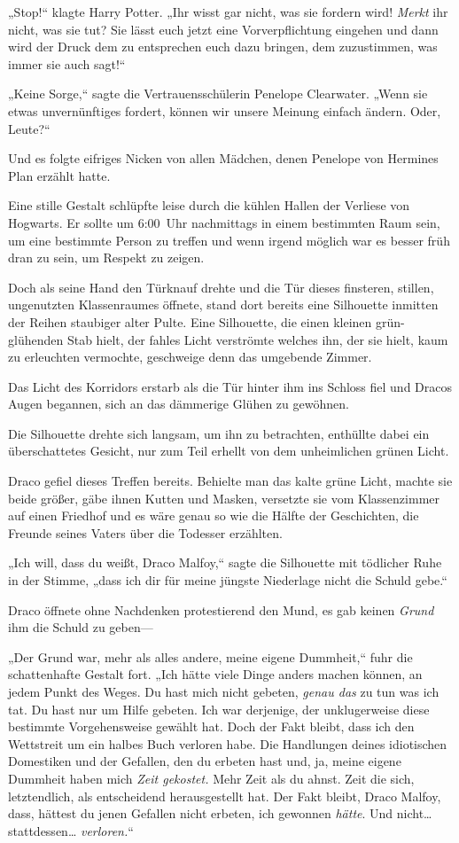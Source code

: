 {„Stop!“ klagte Harry Potter. „Ihr wisst gar nicht, was sie fordern wird! \emph{Merkt} ihr nicht, was sie tut? Sie lässt euch jetzt eine Vorverpflichtung eingehen und dann wird der Druck dem zu entsprechen euch dazu bringen, dem zuzustimmen, was immer sie auch sagt!“

„Keine Sorge,“ sagte die Vertrauensschülerin Penelope Clearwater. „Wenn sie etwas unvernünftiges fordert, können wir unsere Meinung einfach ändern. Oder, Leute?“

Und es folgte eifriges Nicken von allen Mädchen, denen Penelope von Hermines Plan erzählt hatte.

\later

Eine stille Gestalt schlüpfte leise durch die kühlen Hallen der Verliese von Hogwarts. Er sollte um 6:00~Uhr nachmittags in einem bestimmten Raum sein, um eine bestimmte Person zu treffen und wenn irgend möglich war es besser früh dran zu sein, um Respekt zu zeigen.

Doch als seine Hand den Türknauf drehte und die Tür dieses finsteren, stillen, ungenutzten Klassenraumes öffnete, stand dort bereits eine Silhouette inmitten der Reihen staubiger alter Pulte. Eine Silhouette, die einen kleinen grün-glühenden Stab hielt, der fahles Licht verströmte welches ihn, der sie hielt, kaum zu erleuchten vermochte, geschweige denn das umgebende Zimmer.

Das Licht des Korridors erstarb als die Tür hinter ihm ins Schloss fiel und Dracos Augen begannen, sich an das dämmerige Glühen zu gewöhnen.

Die Silhouette drehte sich langsam, um ihn zu betrachten, enthüllte dabei ein überschattetes Gesicht, nur zum Teil erhellt von dem unheimlichen grünen Licht.

Draco gefiel dieses Treffen bereits. Behielte man das kalte grüne Licht, machte sie beide größer, gäbe ihnen Kutten und Masken, versetzte sie vom Klassenzimmer auf einen Friedhof und es wäre genau so wie die Hälfte der Geschichten, die Freunde seines Vaters über die Todesser erzählten.

„Ich will, dass du weißt, Draco Malfoy,“ sagte die Silhouette mit tödlicher Ruhe in der Stimme, „dass ich dir für meine jüngste Niederlage nicht die Schuld gebe.“

Draco öffnete ohne Nachdenken protestierend den Mund, es gab keinen \emph{Grund} ihm die Schuld zu geben—

„Der Grund war, mehr als alles andere, meine eigene Dummheit,“ fuhr die schattenhafte Gestalt fort. „Ich hätte viele Dinge anders machen können, an jedem Punkt des Weges. Du hast mich nicht gebeten, \emph{genau das} zu tun was ich tat. Du hast nur um Hilfe gebeten. Ich war derjenige, der unklugerweise diese bestimmte Vorgehensweise gewählt hat. Doch der Fakt bleibt, dass ich den Wettstreit um ein halbes Buch verloren habe. Die Handlungen deines idiotischen Domestiken und der Gefallen, den du erbeten hast und, ja, meine eigene Dummheit haben mich \emph{Zeit gekostet.} Mehr Zeit als du ahnst. Zeit die sich, letztendlich, als entscheidend herausgestellt hat. Der Fakt bleibt, Draco Malfoy, dass, hättest du jenen Gefallen nicht erbeten, ich gewonnen \emph{hätte}. Und nicht… stattdessen… \emph{verloren.}“

}
